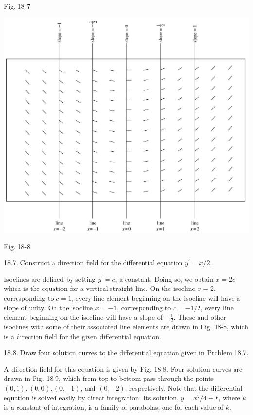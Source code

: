 \documentclass[10pt]{article}
\begin{document}
Fig. 18-7

\begin{center}
\includegraphics[max width=\textwidth]{2024_04_03_5bb5b4275a64cb9887d1g-181}
\end{center}

Fig. 18-8

18.7. Construct a direction field for the differential equation $y^{\prime}=x / 2$.

Isoclines are defined by setting $y^{\prime}=c$, a constant. Doing so, we obtain $x=2 c$ which is the equation for a vertical straight line. On the isocline $x=2$, corresponding to $c=1$, every line element beginning on the isocline will have a slope of unity. On the isocline $x=-1$, corresponding to $c=-1 / 2$, every line element beginning on the isocline will have a slope of $-\frac{1}{2}$. These and other isoclines with some of their associated line elements are drawn in Fig. 18-8, which is a direction field for the given differential equation.

18.8. Draw four solution curves to the differential equation given in Problem 18.7.

A direction field for this equation is given by Fig. 18-8. Four solution curves are drawn in Fig. 18-9, which from top to bottom pass through the points $(0,1),(0,0),(0,-1)$, and $(0,-2)$, respectively. Note that the differential equation is solved easily by direct integration. Its solution, $y=x^{2} / 4+k$, where $k$ is a constant of integration, is a family of parabolas, one for each value of $k$.
\end{document}
